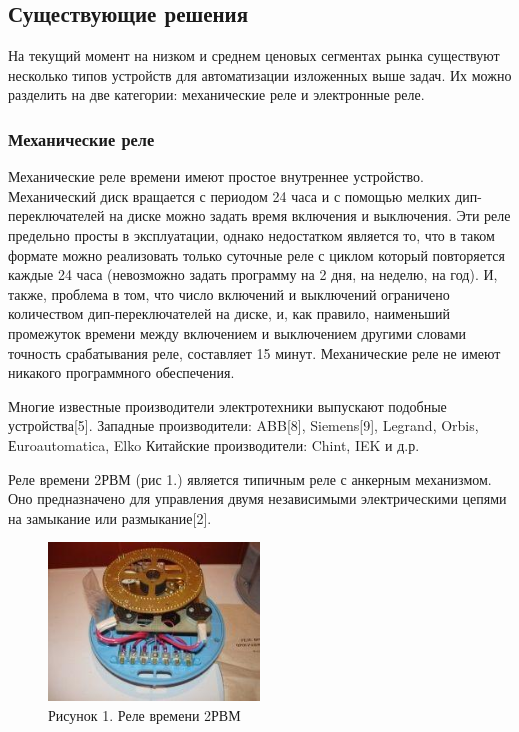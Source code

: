 \subsection{Существующие решения}
На текущий момент на низком и среднем ценовых сегментах рынка существуют несколько типов устройств для автоматизации изложенных выше задач. Их можно разделить на две категории: механические реле и электронные реле.

\subsubsection{Механические реле}
Механические реле времени имеют простое внутреннее устройство. Механический диск вращается с периодом 24 часа и с помощью мелких дип-переключателей на диске можно задать время включения и выключения. Эти реле предельно просты в эксплуатации, однако недостатком является то, что в таком формате можно реализовать только суточные реле с циклом который повторяется каждые 24 часа (невозможно задать программу на 2 дня, на неделю, на год). И, также, проблема в том, что число включений и выключений ограничено количеством дип-переключателей на диске, и, как правило, наименьший промежуток времени между включением и выключением другими словами точность срабатывания реле, составляет 15 минут. Механические реле не имеют никакого программного обеспечения.

Многие известные производители электротехники выпускают подобные устройства[5]. 
Западные производители: ABB[8], Siemens[9], Legrand, Orbis, Еuroautomatica, Elko
Китайские производители: Chint, IEK и д.р.

Реле времени 2РВМ (рис 1.) является типичным реле с анкерным механизмом. Оно предназначено для управления двумя независимыми электрическими цепями на замыкание или размыкание[2].

\begin{figure}[h!]
    \centering
    \includegraphics[width=0.5\textwidth]{mechanical_rele.png}
    \caption{Рисунок 1. Реле времени 2РВМ}
\end{figure}


